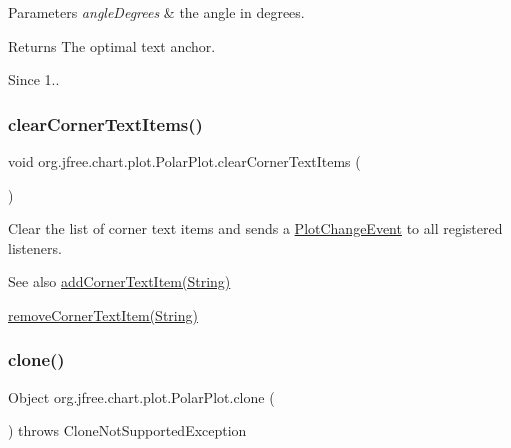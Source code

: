 \begin{DoxyParams}{Parameters}
{\em angle\+Degrees} & the angle in degrees.\\
\hline
\end{DoxyParams}
\begin{DoxyReturn}{Returns}
The optimal text anchor. 
\end{DoxyReturn}
\begin{DoxySince}{Since}
1.. 
\end{DoxySince}
\mbox{\label{classorg_1_1jfree_1_1chart_1_1plot_1_1_polar_plot_ac9867e6b9be35d3b058d5d2b0e44de78}} 
\subsubsection{\texorpdfstring{clear\+Corner\+Text\+Items()}{clearCornerTextItems()}}
{\footnotesize\ttfamily void org.\+jfree.\+chart.\+plot.\+Polar\+Plot.\+clear\+Corner\+Text\+Items (\begin{DoxyParamCaption}{ }\end{DoxyParamCaption})}

Clear the list of corner text items and sends a \mbox{\hyperlink{}{Plot\+Change\+Event}} to all registered listeners.

\begin{DoxySeeAlso}{See also}
\mbox{\hyperlink{classorg_1_1jfree_1_1chart_1_1plot_1_1_polar_plot_a48f5b157d2780b828d04d10b6b8d9191}{add\+Corner\+Text\+Item(\+String)}} 

\mbox{\hyperlink{classorg_1_1jfree_1_1chart_1_1plot_1_1_polar_plot_afc5eb6abe8def313fb7bf1694134c0ac}{remove\+Corner\+Text\+Item(\+String)}} 
\end{DoxySeeAlso}
\mbox{\label{classorg_1_1jfree_1_1chart_1_1plot_1_1_polar_plot_ac2eb5be3682193e569b1dcd8ed612d63}} 
\subsubsection{\texorpdfstring{clone()}{clone()}}
{\footnotesize\ttfamily Object org.\+jfree.\+chart.\+plot.\+Polar\+Plot.\+clone (\begin{DoxyParamCaption}{ }\end{DoxyParamCaption}) throws Clone\+Not\+Supported\+Exception}

